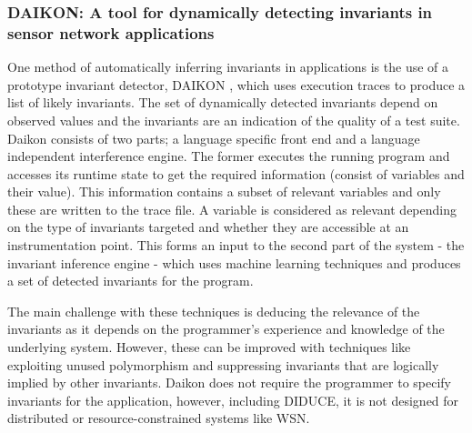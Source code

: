 \subsubsection*{DAIKON: A tool for dynamically detecting invariants in sensor network applications}

One method of automatically inferring invariants in applications is the use of a prototype invariant detector, DAIKON \cite{daikon}, which uses execution traces to produce a list of likely invariants. The set of dynamically detected invariants depend on observed values and the invariants are an indication of the quality of a test suite. Daikon consists of two parts; a language specific front end and a language independent interference engine. The former executes the running program and accesses its runtime state to get the required information (consist of variables and their value). This information contains a subset of relevant variables and only these are written to the trace file. A variable is considered as relevant depending on the type of invariants targeted and whether they are accessible at an instrumentation point. This forms an input to the second part of the system - the invariant inference engine - which uses machine learning techniques and produces a set of detected invariants for the program.

The main challenge with these techniques is deducing the relevance of the invariants as it depends on the programmer's experience and knowledge of the underlying system. However, these can be improved with techniques like exploiting unused polymorphism and suppressing invariants that are logically implied by other invariants. Daikon does not require the programmer to specify invariants for the application, however, including DIDUCE, it is not designed for distributed or resource-constrained systems like WSN.

